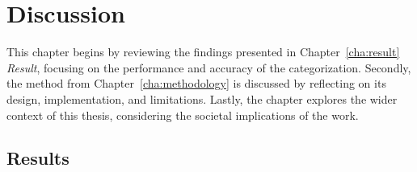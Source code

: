 
\chapter{Discussion}
\label{cha:discussion}
This chapter begins by reviewing the findings presented in Chapter~\ref{cha:result} \textit{Result}, focusing on the performance and accuracy of the categorization. Secondly, the method from Chapter~\ref{cha:methodology} is discussed by reflecting on its design, implementation, and limitations. Lastly, the chapter explores the wider context of this thesis, considering the societal implications of the work. 

\section{Results}
\label{sec:discussion-results}
